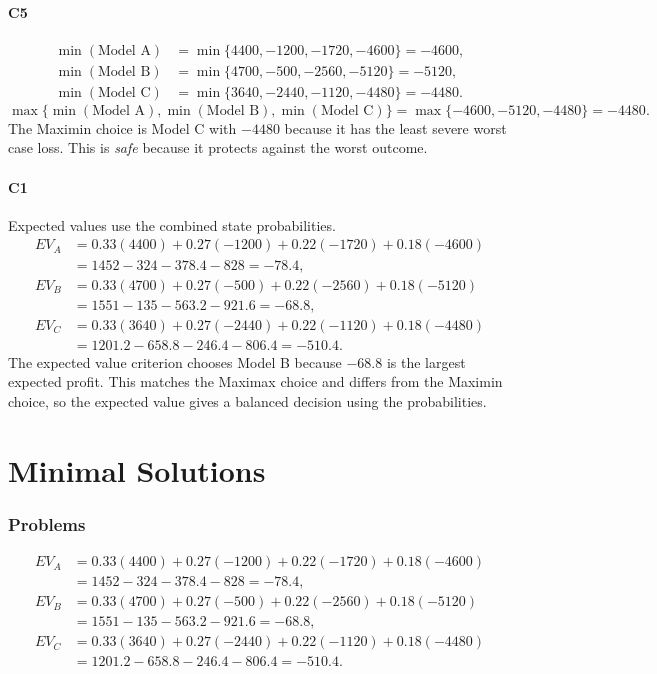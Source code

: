 \begin{ExamProblems}
		\subsection*{C5}
		\[
		\begin{aligned}
		\min(\text{Model A}) &= \min\{4400,-1200,-1720,-4600\} = -4600,\\
		\min(\text{Model B}) &= \min\{4700,-500,-2560,-5120\} = -5120,\\
		\min(\text{Model C}) &= \min\{3640,-2440,-1120,-4480\} = -4480.
		\end{aligned}
		\]
		\[
		\max\{\min(\text{Model A}), \min(\text{Model B}), \min(\text{Model C})\}
		= \max\{-4600, -5120, -4480\}
		= -4480.
		\]
		The Maximin choice is Model C with $-4480$ because it has the least severe worst case loss. This is \emph{safe} because it protects against the worst outcome.

		\subsection*{C1}
		Expected values use the combined state probabilities.
		\[
		\begin{aligned}
		EV_A &= 0.33(4400)+0.27(-1200)+0.22(-1720)+0.18(-4600)\\
		&= 1452-324-378.4-828=-78.4,\\
		EV_B &= 0.33(4700)+0.27(-500)+0.22(-2560)+0.18(-5120)\\
		&= 1551-135-563.2-921.6=-68.8,\\
		EV_C &= 0.33(3640)+0.27(-2440)+0.22(-1120)+0.18(-4480)\\
		&= 1201.2-658.8-246.4-806.4=-510.4.
		\end{aligned}
		\]
		The expected value criterion chooses Model B because $-68.8$ is the largest expected profit. This matches the Maximax choice and differs from the Maximin choice, so the expected value gives a balanced decision using the probabilities.
	\end{ExamProblems}


\part{Minimal Solutions}

\section*{Problems}
\[\begin{aligned}
		EV_A &= 0.33(4400)+0.27(-1200)+0.22(-1720)+0.18(-4600)\\
		&= 1452-324-378.4-828=-78.4,\\
		EV_B &= 0.33(4700)+0.27(-500)+0.22(-2560)+0.18(-5120)\\
		&= 1551-135-563.2-921.6=-68.8,\\
		EV_C &= 0.33(3640)+0.27(-2440)+0.22(-1120)+0.18(-4480)\\
		&= 1201.2-658.8-246.4-806.4=-510.4.
		\end{aligned}\]



